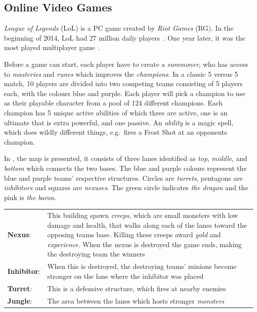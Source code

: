 \subsection{Online Video Games}\label{sec:onlinevideogames}

\emph{League of Legends} (LoL) is a PC game created by \emph{Riot Games} (RG). In the beginning of 2014, LoL had 27 million daily players~\cite{LoL27mill}. One year later, it was the most played multiplayer game~\cite{LoLmostplayed}.

Before a game can start, each player have to create a \emph{summoner}, who has access to \emph{masteries} and \emph{runes} which improves the \emph{champions}. In a classic 5 versus 5 match, 10 players are divided into two competing teams consisting of 5 players each, with the colours blue and purple. Each player will pick a champion to use as their playable character from a pool of 124 different champions. Each champion has 5 unique active abilities of which three are active, one is an ultimate that is extra powerful, and one passive. An \emph{ability} is a magic spell, which does wildly different things, e.g.\ fires a Frost Shot at an opponents champion. 

In , the map is presented, it consists of three lanes identified as \emph{top}, \emph{middle}, and \emph{bottom} which connects the two bases. The blue and purple colours represent the blue and purple teams' respective structures. Circles are \emph{turrets}, pentagons are \emph{inhibitors} and squares are \emph{nexuses}. The green circle indicates \emph{the dragon} and the pink is \emph{the baron}.

\begin{table}[!h]
  \begin{tabular}{l p{13cm}}
    \textbf{Nexus}: & This building spawn \emph{creeps}, which are small monsters with low damage and health, that walks along each of the lanes toward the opposing teams base. Killing these creeps award \emph{gold} and \emph{experience}. When the nexus is destroyed the game ends, making the destroying team the winners\\
    \textbf{Inhibitor}: & When this is destroyed, the destroying teams' minions become stronger on the lane where the inhibitor was placed\\
    \textbf{Turret}: & This is a defensive structure, which fires at nearby enemies\\
    \textbf{Jungle}: & The area between the lanes which hosts stronger \emph{monsters}\\
  \end{tabular}
\end{table}

